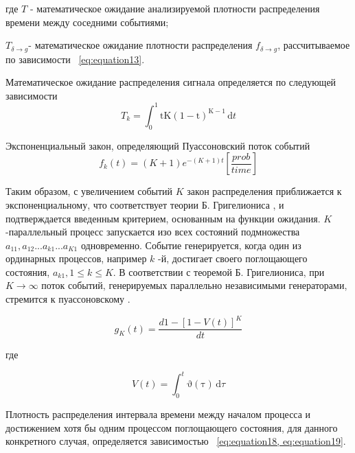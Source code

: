 где $T$ - математическое ожидание анализируемой плотности распределения времени между соседними событиями; 

$T_{\delta \rightarrow g}$- математическое ожидание плотности распределения $f_{\delta \rightarrow g}$, рассчитываемое по зависимости ~\cref{eq:equation13}.

Математическое ожидание распределения сигнала определяется по следующей зависимости 
\begin{equation}
    \label{eq:equation16}
    T_k = \int_0^1 \mathrm{tK(1-t)^{K-1}}\,\mathrm{d}t
\end{equation}

Экспоненциальный закон, определяющий Пуассоновский поток событий
\begin{equation}
    \label{eq:equation17}
    f_k(t) = (K+1)e^{-(K+1)t}[\frac{prob}{time}]
\end{equation}

Таким образом, с увеличением событий $K$ закон распределения приближается к экспоненциальному, что соответствует теории Б. Григелиониса \cite{Ref2}, и подтверждается введенным критерием, основанным на функции ожидания.  $K$-параллельный процесс запускается изо всех состояний подмножества $a_{11}, a_{12} ... a_{k1} ... a_{K1}$ одновременно. Событие генерируется, когда один из ординарных процессов, например $k$ -й, достигает своего поглощающего состояния, $a_{k1} , 1 ≤ k ≤ K $. В соответствии с теоремой Б. Григелиониса, при $K \rightarrow \infty$ поток событий, генерируемых параллельно независимыми генераторами, стремится к пуассоновскому \cite{Ref2}.

\begin{equation}
    \label{eq:equation18}
    g_{K}(t) = \frac{d{1-[1-V(t)]^K}}{dt}
\end{equation}

где 

\begin{equation}
    \label{eq:equation19}
    V(t) = \int_0^t \mathrm{\vartheta(\tau)}\,\mathrm{d}\tau
\end{equation}

Плотность распределения интервала времени между началом процесса и достижением хотя бы одним процессом поглощающего состояния, для данного конкретного случая, определяется зависимостью ~\cref{eq:equation18, eq:equation19}.

